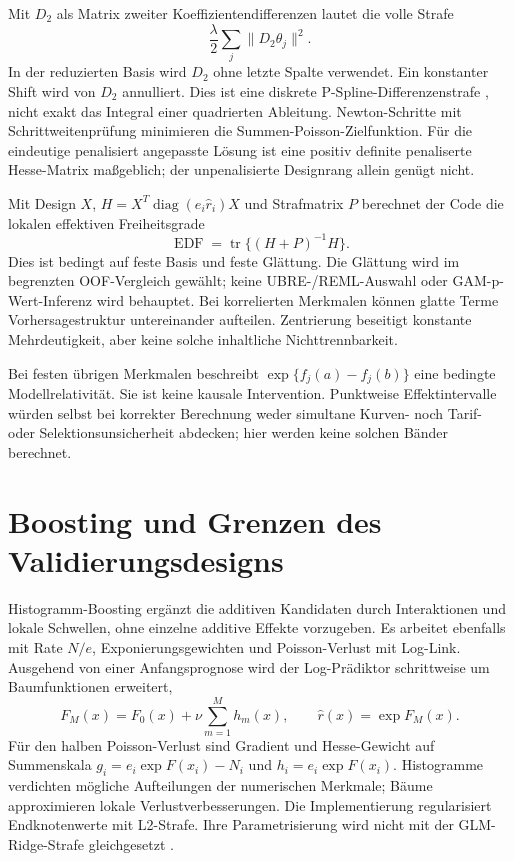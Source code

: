 \documentclass[11pt,a4paper]{article}
\begin{document}
Mit $D_2$ als Matrix zweiter Koeffizientendifferenzen lautet die volle Strafe
\begin{equation}
 \frac{\lambda}{2}\sum_j\|D_2\theta_j\|^2.
\end{equation}
In der reduzierten Basis wird $D_2$ ohne letzte Spalte verwendet. Ein konstanter Shift wird von $D_2$ annulliert. Dies ist eine diskrete P-Spline-Differenzenstrafe \cite{eilers}, nicht exakt das Integral einer quadrierten Ableitung. Newton-Schritte mit Schrittweitenprüfung minimieren die Summen-Poisson-Zielfunktion. Für die eindeutige penalisiert angepasste Lösung ist eine positiv definite penaliserte Hesse-Matrix maßgeblich; der unpenalisierte Designrang allein genügt nicht.

Mit Design $X$, $H=X^T\operatorname{diag}(e_i\widehat r_i)X$ und Strafmatrix $P$ berechnet der Code die lokalen effektiven Freiheitsgrade
\begin{equation}
 \operatorname{EDF}=\operatorname{tr}\{(H+P)^{-1}H\}.
\end{equation}
Dies ist bedingt auf feste Basis und feste Glättung. Die Glättung wird im begrenzten OOF-Vergleich gewählt; keine UBRE-/REML-Auswahl oder GAM-p-Wert-Inferenz wird behauptet. Bei korrelierten Merkmalen können glatte Terme Vorhersagestruktur untereinander aufteilen. Zentrierung beseitigt konstante Mehrdeutigkeit, aber keine solche inhaltliche Nichttrennbarkeit.

Bei festen übrigen Merkmalen beschreibt $\exp\{f_j(a)-f_j(b)\}$ eine bedingte Modellrelativität. Sie ist keine kausale Intervention. Punktweise Effektintervalle würden selbst bei korrekter Berechnung weder simultane Kurven- noch Tarif- oder Selektionsunsicherheit abdecken; hier werden keine solchen Bänder berechnet.

\clearpage
\section{Boosting und Grenzen des Validierungsdesigns}
Histogramm-Boosting ergänzt die additiven Kandidaten durch Interaktionen und lokale Schwellen, ohne einzelne additive Effekte vorzugeben. Es arbeitet ebenfalls mit Rate $N/e$, Exponierungsgewichten und Poisson-Verlust mit Log-Link. Ausgehend von einer Anfangsprognose wird der Log-Prädiktor schrittweise um Baumfunktionen erweitert,
\begin{equation}
 F_M(x)=F_0(x)+\nu\sum_{m=1}^M h_m(x),\qquad \widehat r(x)=\exp F_M(x).
\end{equation}
Für den halben Poisson-Verlust sind Gradient und Hesse-Gewicht auf Summenskala $g_i=e_i\exp F(x_i)-N_i$ und $h_i=e_i\exp F(x_i)$. Histogramme verdichten mögliche Aufteilungen der numerischen Merkmale; Bäume approximieren lokale Verlustverbesserungen. Die Implementierung regularisiert Endknotenwerte mit L2-Strafe. Ihre Parametrisierung wird nicht mit der GLM-Ridge-Strafe gleichgesetzt \cite{hgb}.
\end{document}
